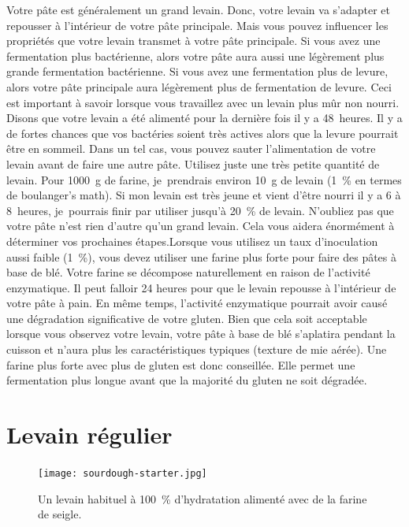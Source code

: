 Votre pâte est généralement un grand levain. Donc, votre levain va
s'adapter et repousser à l'intérieur de votre pâte principale. Mais vous pouvez influencer les
propriétés que votre levain transmet à votre pâte principale. Si vous avez une fermentation plus
bactérienne, alors votre pâte aura aussi une légèrement plus grande fermentation bactérienne. Si vous avez une fermentation plus de levure, alors votre pâte principale aura légèrement plus de fermentation de levure. Ceci est important à savoir lorsque vous travaillez avec un levain plus mûr non nourri. Disons que votre levain a été alimenté pour la dernière fois il y a 48~heures. Il y a de fortes chances que vos bactéries soient très actives alors que
la levure pourrait être en sommeil. Dans un tel cas, vous pouvez sauter l'alimentation de votre levain
avant de faire une autre pâte. Utilisez juste une très petite quantité de levain. Pour \qty{1000}{\gram}
de farine, je~prendrais environ \qty{10}{\gram} de levain (\qty{1}{\percent} en termes de boulanger's
math). Si mon levain est très jeune et vient d'être nourri il y a 6 à 8~heures, je~pourrais
finir par utiliser jusqu'à \qty{20}{\percent} de levain. N'oubliez pas que votre pâte n'est rien
d'autre qu'un grand levain. Cela vous aidera énormément à déterminer
vos prochaines étapes.Lorsque vous utilisez un taux d'inoculation aussi faible (\qty{1}{\percent}), vous devez utiliser une farine plus forte pour faire des pâtes à base de blé. Votre farine se décompose naturellement en raison de l'activité enzymatique. Il peut falloir 24 heures pour que le levain repousse à l'intérieur de votre pâte à pain. En même temps, l'activité enzymatique pourrait avoir causé une dégradation significative de votre gluten. Bien que cela soit acceptable lorsque vous observez votre levain, votre pâte à base de blé s'aplatira pendant la cuisson et n'aura plus les caractéristiques typiques (texture de mie aérée). Une farine plus forte avec plus de gluten est donc conseillée. Elle permet une fermentation plus longue avant que la majorité du gluten ne soit dégradée.

\section{Levain régulier}

\begin{figure}[!htb]
  \texttt{[image: sourdough-starter.jpg]}
  \caption[Levain régulier]{Un levain habituel à \qty{100}{\percent}
      d'hydratation alimenté avec de la farine de seigle.}%
  \label{fig:regular-sourdough-starter}
\end{figure}

